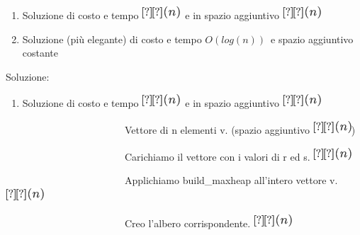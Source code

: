 \documentclass{article}
\providecommand{\tightlist}{%
  \setlength{\itemsep}{0pt}\setlength{\parskip}{0pt}}
\begin{document}
\begin{enumerate}
\tightlist
\item
  {Soluzione di costo e tempo }\includegraphics{images/image149.png}{~e
  in spazio aggiuntivo }\includegraphics{images/image149.png}
\item
  {Soluzione (più elegante) di costo e tempo
  }$O(log(n))${~e spazio aggiuntivo costante}
\end{enumerate}

{}

{Soluzione}{:}

\begin{enumerate}
\tightlist
\item
  {Soluzione di costo e tempo }\includegraphics{images/image149.png}{~e
  in spazio aggiuntivo }\includegraphics{images/image149.png}
\end{enumerate}

{}

{~~~~~~~~~~~~~~~~~~~~~~~~Vettore di n elementi v. (spazio aggiuntivo
}\includegraphics{images/image149.png}{)}

{~~~~~~~~~~~~~~~~~~~~~~~~Carichiamo il vettore con i valori di r ed s.
}\includegraphics{images/image149.png}

{~~~~~~~~~~~~~~~~~~~~~~~~Applichiamo build\_maxheap all'intero vettore
v.}\includegraphics{images/image149.png}

{~~~~~~~~~~~~~~~~~~~~~~~~Creo l'albero corrispondente.
}\includegraphics{images/image149.png}

{}
\end{document}
